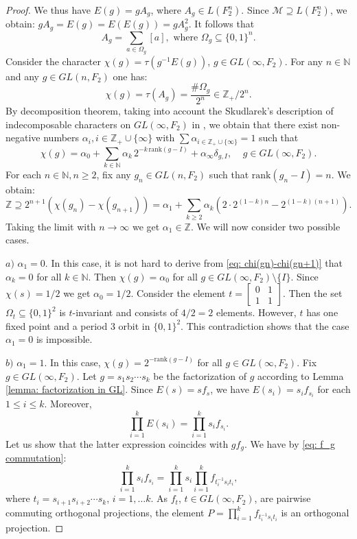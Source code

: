 \documentclass[11pt]{amsart}
\theoremstyle{plain}
\theoremstyle{definition}
\theoremstyle{remark}
\numberwithin{equation}{section}
\begin{document}
\begin{proof}
We thus have $E(g)=gA_g$, where $A_g\in L(F_2^n)$. Since $\mathcal M\supseteq L(F_2^n)$, we obtain: $gA_g=E(g)=E(E(g))=gA_g^2$. It follows that 
\begin{equation}\label{eq: Ag expansion}
	A_g=\sum\limits_{a\in\Omega_g}[a],\text{ where }\Omega_g\subseteq\{0,1\}^n.
\end{equation}
Consider the character $\chi(g)=\tau(g^{-1}E(g))$, $g \in GL(\infty,F_2)$. For any $n\in\mathbb N$ and any $g\in GL(n,F_2)$ one has:
\begin{equation}\label{eq: tau(Ag)}
	\chi(g)=\tau(A_g)=\frac{\#\Omega_g}{2^n}\in \mathbb Z_+/2^n.
\end{equation}
By decomposition theorem, taking into account the Skudlarek's description of indecomposable characters on $GL(\infty,F_2)$ in \cite{Skudlarek}, we obtain that there exist non-negative numbers $\alpha_i,i\in\mathbb Z_+\cup\{\infty\}$ with $\sum\alpha_{i\in\mathbb Z_+\cup\{\infty\}}=1$ such that 
$$\chi(g)=\alpha_0+\sum\limits_{k\in\mathbb N}\alpha_k\,2^{-k\,\mathrm{rank}(g-I)}+\alpha_\infty\delta_{g,I},\;\;\;\;g\in GL(\infty,F_2).$$ 
For each $n\in\mathbb N, n\geqslant 2$, fix any $g_n\in GL(n,F_2)$ such that $\mathrm{rank}(g_n-I)=n$. We obtain:
\begin{equation}\label{eq: chi(gn)-chi(gn+1)}
	\mathbb Z\supseteq 2^{n+1}(\chi(g_n)-\chi(g_{n+1}))=\alpha_1+
	\sum\limits_{k\geqslant 2}\alpha_k(2\cdot2^{(1-k)n}-2^{(1-k)(n+1)}).
\end{equation}
Taking the limit with $n\to\infty$ we get $\alpha_1\in\mathbb Z$. We will now consider two possible cases.

\smallskip\noindent
$a)$ $\alpha_1=0$. In this case, it is not hard to derive from \eqref{eq: chi(gn)-chi(gn+1)} that $\alpha_k=0$ for all $k\in\mathbb N$. Then $\chi(g)=\alpha_0$ for all $g\in GL(\infty,F_2)\setminus \{I\}$. Since $\chi(s)=1/2$ we get $\alpha_0=1/2$. Consider the element $t=\begin{bmatrix}
	0&1\\1&1
\end{bmatrix}$. Then the set $\Omega_t\subseteq\{0,1\}^2$ is $t$-invariant and consists of $4/2=2$ elements. However, $t$ has one fixed point and a period 3 orbit in $\{0,1\}^2$. This contradiction shows that the case $\alpha_1=0$ is impossible. 

\smallskip\noindent
$b)$ $\alpha_1=1$. In this case, $\chi(g)=2^{-\mathrm{rank}(g-I)}$ for all $g\in GL(\infty, F_2)$. Fix $g\in GL(\infty,F_2)$. Let $g=s_1s_2\cdots s_k$ be the factorization of $g$ according to Lemma \ref{lemma: factorization in GL}. Since $E(s)=sf_s$, we have $E(s_i)=s_if_{s_i}$ for each $1\leqslant i\leqslant k$. Moreover, $$\prod\limits_{i=1}^k E(s_i)=\prod\limits_{i=1}^k s_if_{s_i}.$$ Let us show that the latter expression coincides with $gf_g$. We have by \eqref{eq: f_g commutation}:
$$\prod\limits_{i=1}^k s_if_{s_i}=\prod\limits_{i=1}^k s_i\prod\limits_{i=1}^k f_{t_i^{-1}s_it_i},$$ where $t_i=s_{i+1}s_{i+2}\cdots s_k$, $i=1,\ldots k$. As $f_t$, $t\in GL(\infty,F_2)$, are pairwise commuting orthogonal projections, the element $P=\prod\limits_{i=1}^k f_{t_i^{-1}s_it_i}$ is an orthogonal projection. %


\end{proof}
\end{document}
